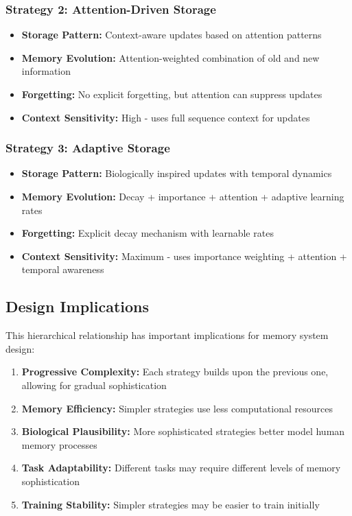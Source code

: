 \documentclass{article}
\begin{document}
\subsubsection{Strategy 2: Attention-Driven Storage}
\begin{itemize}
\item \textbf{Storage Pattern:} Context-aware updates based on attention patterns
\item \textbf{Memory Evolution:} Attention-weighted combination of old and new information
\item \textbf{Forgetting:} No explicit forgetting, but attention can suppress updates
\item \textbf{Context Sensitivity:} High - uses full sequence context for updates
\end{itemize}

\subsubsection{Strategy 3: Adaptive Storage}
\begin{itemize}
\item \textbf{Storage Pattern:} Biologically inspired updates with temporal dynamics
\item \textbf{Memory Evolution:} Decay + importance + attention + adaptive learning rates
\item \textbf{Forgetting:} Explicit decay mechanism with learnable rates
\item \textbf{Context Sensitivity:} Maximum - uses importance weighting + attention + temporal awareness
\end{itemize}

\subsection{Design Implications}

This hierarchical relationship has important implications for memory system design:

\begin{enumerate}
\item \textbf{Progressive Complexity:} Each strategy builds upon the previous one, allowing for gradual sophistication
\item \textbf{Memory Efficiency:} Simpler strategies use less computational resources
\item \textbf{Biological Plausibility:} More sophisticated strategies better model human memory processes
\item \textbf{Task Adaptability:} Different tasks may require different levels of memory sophistication
\item \textbf{Training Stability:} Simpler strategies may be easier to train initially
\end{enumerate}
\end{document}
